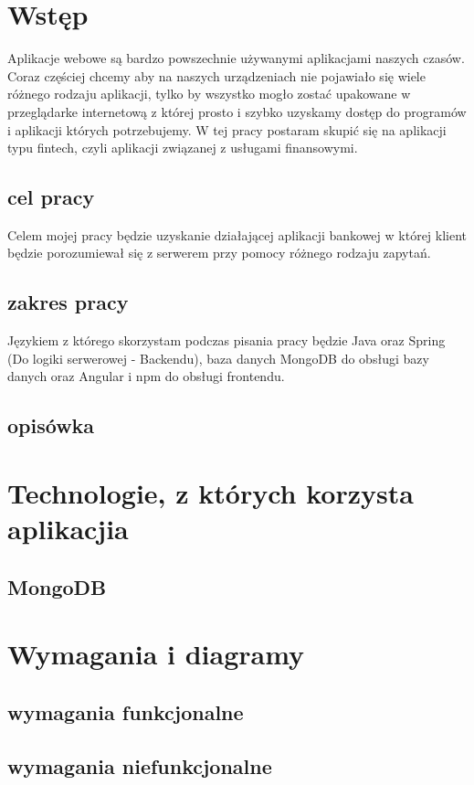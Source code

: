 \documentclass[a4paper,11pt,twoside]{mgr}
\begin{document}
\pagestyle{empty}
\stronaTytulowa
\cleardoublepage

\tableofcontents

\pagestyle{fancy}

\chapter*{Wstęp}
Aplikacje webowe są bardzo powszechnie używanymi aplikacjami naszych czasów. Coraz częściej chcemy aby na naszych urządzeniach nie pojawiało się wiele różnego rodzaju aplikacji, tylko by wszystko mogło zostać upakowane w przeglądarke internetową z której prosto i szybko uzyskamy dostęp do programów i aplikacji których potrzebujemy. 
W tej pracy postaram skupić się na aplikacji typu fintech, czyli aplikacji związanej z usługami finansowymi.
\section*{cel pracy}
Celem mojej pracy będzie uzyskanie działającej aplikacji bankowej w której klient będzie porozumiewał się z serwerem przy pomocy różnego rodzaju zapytań.
\section*{zakres pracy}
Językiem z którego skorzystam podczas pisania pracy będzie Java oraz Spring (Do logiki serwerowej - Backendu), baza danych MongoDB do obsługi bazy danych oraz Angular i npm do obsługi frontendu.
\section*{opisówka}
\chapter{Technologie, z których korzysta aplikacjia}


\section{MongoDB}
\chapter{Wymagania i diagramy}
\section{wymagania funkcjonalne}
\section{wymagania niefunkcjonalne}
\end{document}
